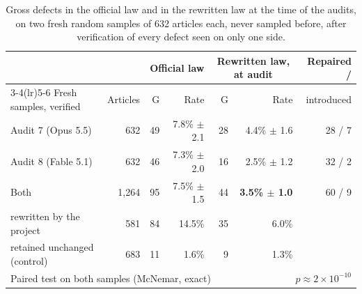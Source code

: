 \documentclass[11pt,a4paper]{article}
\begin{document}
\begin{table}[ht]
\centering
\small
\begin{tabular}{lrrrrrr}
\toprule
& & \multicolumn{2}{c}{Official law} & \multicolumn{2}{c}{Rewritten law, at audit} & Repaired /\\
\cmidrule(lr){3-4}\cmidrule(lr){5-6}
Fresh samples, verified & Articles & G & Rate & G & Rate & introduced\\
\midrule
Audit 7 (Opus 5.5) & 632 & 49 & 7.8\% $\pm$ 2.1 & 28 & 4.4\% $\pm$ 1.6 & 28 / 7\\
Audit 8 (Fable 5.1) & 632 & 46 & 7.3\% $\pm$ 2.0 & 16 & 2.5\% $\pm$ 1.2 & 32 / 2\\
\midrule
Both & 1{,}264 & 95 & 7.5\% $\pm$ 1.5 & 44 & \textbf{3.5\% $\pm$ 1.0} & 60 / 9\\
\quad rewritten by the project & 581 & 84 & 14.5\% & 35 & 6.0\% & \\
\quad retained unchanged (control) & 683 & 11 & 1.6\% & 9 & 1.3\% & \\
\midrule
\multicolumn{5}{l}{Paired test on both samples (McNemar, exact)} & \multicolumn{2}{r}{$p \approx 2\times10^{-10}$}\\
\bottomrule
\end{tabular}
\caption{Gross defects in the official law and in the rewritten law at the time of the audits, on two fresh random samples of 632 articles each, never sampled before, after verification of every defect seen on only one side.}
\label{tab:fresh}
\end{table}
\end{document}
